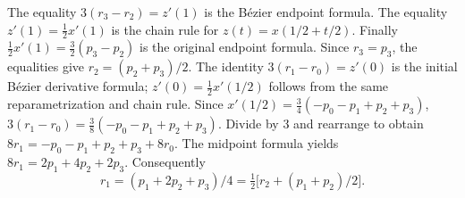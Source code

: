 The equality $3(r_3-r_2)=z'(1)$ is the B\'ezier endpoint formula.
The equality $z'(1)=\tfrac12x'(1)$ is the chain rule for
$z(t)=x(1/2+t/2)$.
Finally $\tfrac12x'(1)=\tfrac32(p_3-p_2)$ is the original endpoint formula.
Since $r_3=p_3$, the equalities give $r_2=(p_2+p_3)/2$.
The identity $3(r_1-r_0)=z'(0)$ is the initial B\'ezier derivative formula;
$z'(0)=\tfrac12x'(1/2)$ follows from the same reparametrization and chain rule.
Since $x'(1/2)=\tfrac34(-p_0-p_1+p_2+p_3)$,
$3(r_1-r_0)=\tfrac38(-p_0-p_1+p_2+p_3)$.
Divide by $3$ and rearrange to obtain
$8r_1=-p_0-p_1+p_2+p_3+8r_0$.
The midpoint formula yields
$8r_1=2p_1+4p_2+2p_3$. Consequently
\[
 r_1=(p_1+2p_2+p_3)/4
     =\tfrac12\big[r_2+(p_1+p_2)/2\big].
\]

